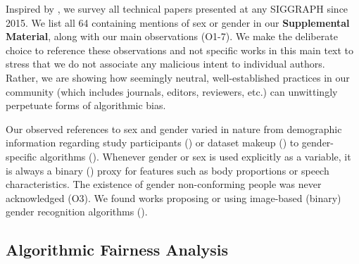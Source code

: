\documentclass[sigconf,balance=false]{acmart}
\begin{document}

Inspired by \citet{keyes2018misgendering}, we survey
all technical papers presented at any SIGGRAPH since 2015. We list all 64 containing mentions of sex or gender in our \textbf{Supplemental Material}, along with our main observations (O1-7). We make the deliberate choice to reference these observations and not specific works in this main text to stress that we do not associate any malicious intent to individual authors. Rather, we are showing how seemingly neutral, well-established practices in our community (which includes journals, editors, reviewers, etc.) can unwittingly perpetuate forms of algorithmic bias.

Our observed references to sex and gender varied in nature from demographic information regarding study participants (\userstudy) or dataset makeup (\dataset) to gender-specific algorithms (\var). Whenever gender or sex is used
explicitly as a variable, it is always a binary (\binary) proxy for features such as body proportions or speech characteristics. The existence of gender non-conforming people was never acknowledged (O3). We found works proposing or using image-based (binary) gender recognition algorithms (\classifier).



\subsection{Algorithmic Fairness Analysis}\label{sec:analysis}
\end{document}
